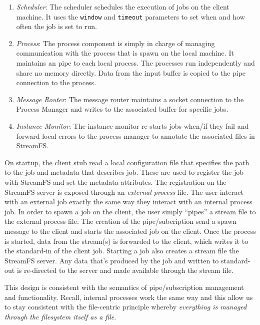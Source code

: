 \begin{enumerate}
\item \emph{Scheduler}: The scheduler schedules the execution of jobs on the client machine.  It uses the \texttt{window} and
						\texttt{timeout} parameters to set when and how often the job is set to run.
\item \emph{Process}:  The process component is simply in charge of managing communication with the process that is spawn
						on the local machine.  It maintains an pipe to each local process.  The processes
						run independently and share no memory directly.  Data from the input buffer is copied to the 
						pipe connection to the process.
\item \emph{Message Router}: The message router maintains a socket connection to the Process Manager and writes to the associated
								buffer for specific jobs.
\item \emph{Instance Monitor}: The instance monitor re-starts jobs when/if they fail and forward local errors to the process manager
								to annotate the associated files in StreamFS.
\end{enumerate}

On startup, the client stub read a local configuration file that specifies the path to the job and metadata that describes
job.  These are used to register the job with StreamFS and set the metadata attributes.  The registration on the StreamFS 
server is exposed through an \emph{external process} file.  The user interact with an external job exactly the same way they
interact with an internal process job.  In order to spawn a job on the client, the user simply ``pipes'' a stream file 
to the external process file.  The creation of the pipe/subcription send a spawn message to the client and starts the associated
job on the client.  Once the process is started, data from the stream(s) is forwarded to the client, which writes it to the 
standard-in of the client job.  Starting a job also creates a stream file the StreamFS server.  Any data that's produced by the job
and written to standard-out is re-directed to the server and made available through the stream file.

This design is consistent with the semantics of pipe/subscription management and functionality.  Recall, internal processes
work the same way and this allow us to stay consistent with the file-centric principle whereby \emph{everything is managed
through the filesystem itself as a file}.

